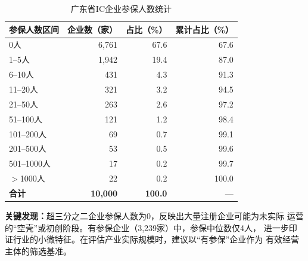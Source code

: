 \documentclass[12pt,a4paper]{ctexart}
\newcommand{\tableHeaderRow}{\rowcolor{tealPrimary}\color{white}}
\newcommand{\tableOddRow}{\rowcolor{mintBG}}
\newcommand{\tableEvenRow}{\rowcolor{white}}
\begin{document}
\begin{table}[H]
\centering
\caption{广东省IC企业参保人数统计}
\label{tab:insurance}
\begin{tabular}{lrrr}
\toprule
\tableHeaderRow
\textbf{参保人数区间} & \textbf{企业数（家）} & \textbf{占比（\%）} & \textbf{累计占比（\%）} \\
\midrule
\tableOddRow  0人       & 6,761 & 67.6 & 67.6  \\
\tableEvenRow 1--5人    & 1,942 & 19.4 & 87.0  \\
\tableOddRow  6--10人   & 431   & 4.3  & 91.3  \\
\tableEvenRow 11--20人  & 321   & 3.2  & 94.5  \\
\tableOddRow  21--50人  & 263   & 2.6  & 97.2  \\
\tableEvenRow 51--100人 & 121   & 1.2  & 98.4  \\
\tableOddRow  101--200人 & 69   & 0.7  & 99.1  \\
\tableEvenRow 201--500人 & 53   & 0.5  & 99.6  \\
\tableOddRow  501--1000人 & 17  & 0.2  & 99.7  \\
\tableEvenRow $>$1000人  & 22   & 0.2  & 100.0 \\
\midrule
\tableOddRow  \textbf{合计} & \textbf{10,000} & \textbf{100.0} & — \\
\bottomrule
\end{tabular}
\end{table}

\textbf{关键发现：}超三分之二企业参保人数为0，反映出大量注册企业可能为未实际
运营的``空壳''或初创阶段。有参保企业（3,239家）中，参保中位数仅4人，
进一步印证行业的小微特征。在评估产业实际规模时，建议以``有参保''企业作为
有效经营主体的筛选基准。
\end{document}
